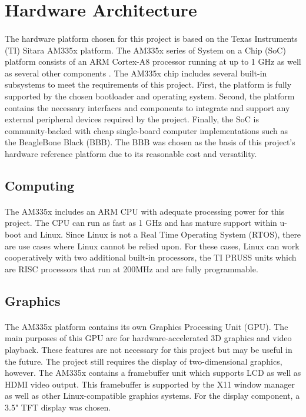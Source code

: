 \section{Hardware Architecture}

\paragraph{}
The hardware platform chosen for this project is based on the Texas Instruments (TI) Sitara AM335x platform.
The AM335x series of System on a Chip (SoC) platform consists of an ARM Cortex-A8 processor running at up to 1 GHz as well as several other components \cite{am335x-overview}.
The AM335x chip includes several built-in subsystems to meet the requirements of this project.
First, the platform is fully supported by the chosen bootloader and operating system.
Second, the platform contains the necessary interfaces and components to integrate and support any external peripheral devices required by the project.
Finally, the SoC is community-backed with cheap single-board computer implementations such as the BeagleBone Black (BBB).
The BBB was chosen as the basis of this project's hardware reference platform due to its reasonable cost and versatility.

\subsection{Computing}

\paragraph{}
The AM335x includes an ARM CPU with adequate processing power for this project.
The CPU can run as fast as 1 GHz and has mature support within u-boot and Linux.
Since Linux is not a Real Time Operating System (RTOS), there are use cases where Linux cannot be relied upon.
For these cases, Linux can work cooperatively with two additional built-in processors, the TI PRUSS units which are RISC processors that run at 200MHz and are fully programmable.

\subsection{Graphics}

\paragraph{}
The AM335x platform contains its own Graphics Processing Unit (GPU).
The main purposes of this GPU are for hardware-accelerated 3D graphics and video playback.
These features are not necessary for this project but may be useful in the future.
The project still requires the display of two-dimensional graphics, however.
The AM335x contains a framebuffer unit which supports LCD as well as HDMI video output.
This framebuffer is supported by the X11 window manager as well as other Linux-compatible graphics systems.
For the display component, a 3.5" TFT display was chosen.


